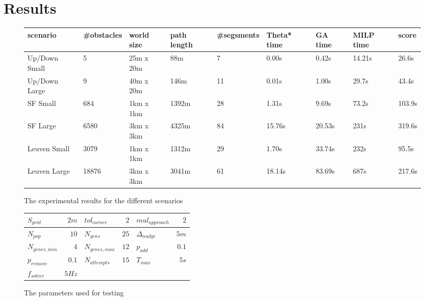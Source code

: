 \section{Results}
\begin{figure}
\begin{tabular}{ l l l l l l l l l }
 scenario & \#obstacles & world size & path length & \#segsments & Theta* time & GA time & MILP time & score \\ 
 \hline
Up/Down Small & 5 &  25m x 20m & 88m  & 7 & 0.00s & 0.42s & 14.21s & 26.6s\\
Up/Down Large & 9 & 40m x 20m &  146m & 11 & 0.01s & 1.00s & 29.7s & 43.4s \\
SF Small & 684 & 1km x 1km & 1392m & 28 & 1.31s & 9.69s & 73.2s & 103.9s \\
SF Large & 6580 & 3km x 3km & 4325m  & 84 & 15.76s & 20.53s & 231s & 319.6s\\
Leuven Small & 3079 & 1km x 1km & 1312m & 29 &  1.70s & 33.74s & 232s  & 95.5s \\
Leuven Large & 18876 & 3km x 3km & 3041m & 61 & 18.14s & 83.69s & 687s & 217.6s \\

\end{tabular}
\caption{The experimental results for the different scenarios}
\label{table:results}
\end{figure}
\begin{figure}
\begin{tabular}{ l  r | l r | l r }

$S_{grid}$ & $2m$ & $tol_{corner}$ & $2$ & $ mul_{approach} $ & $2$ \\
\hline
 $ N_{pop}$ & $ 10$ & $N_{gens}$ & $25$ & $\Delta_{nudge}$ & $5m$\\
 \hline
 $ N_{genes,min}$ & $ 4$ & $N_{genes,max}$ & $12$ & $p_{add}$ & $0.1$\\
 \hline
 $ p_{remove}$ & $0.1$ & $N_{attempts}$ & $15$ & $ T_{max}$ & $5s$ \\
 $f_{solver}$ & $5Hz$ & & & &
\end{tabular}
\caption{The parameters used for testing}
\label{table:params}
\end{figure}
